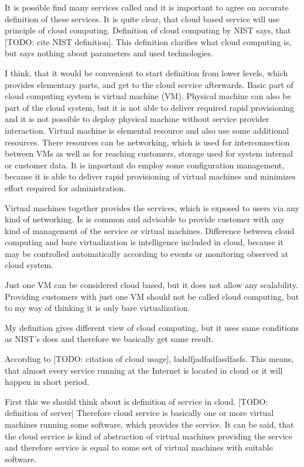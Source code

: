 
It is possible find many services called  and it is important to agree on accurate definition of these services. It is quite clear, that cloud based service will use principle of cloud computing. Definition of cloud computing by \Ac{NIST} says, that  [TODO: cite NIST definition]. This definition clarifies what cloud computing is, but says nothing about parameters and used technologies.

I think, that it would be convenient to start definition from lower levels, which provides elementary parts, and get to the cloud service afterwards. Basic part of cloud computing system is virtual machine (\Ac{VM}). Physical machine can also be part of the cloud system, but it is not able to deliver required rapid provisioning and it is not possible to deploy physical machine without service provider interaction. Virtual machine is elemental resource and also use some additional resources. There resources can be networking, which is used for interconnection between \Ac{VM}s as well as for reaching customers, storage used for system internal or customer data. It is important do employ some configuration management, because it is able to deliver rapid provisioning of virtual machines and minimizes effort required for administration.

Virtual machines together provides the services, which is exposed to users via any kind of networking. Is is common and advisable to provide customer with any kind of management of the service or virtual machines. Difference between cloud computing and bare virtualization is intelligence included in cloud, because it may be controlled automatically according to events or monitoring observed at cloud system. 

Just one \Ac{VM} can be considered cloud based, but it does not allow any scalability. Providing customers with just one \Ac{VM} should not be called cloud computing, but to my way of thinking it is only bare virtualization.

My definition gives different view of cloud computing, but it uses same conditions as \Ac{NIST}'s does and therefore we basically get same result.


According to [TODO: citation of cloud usage], ladslfjadfadfasdfasfs. This means, that almost every service running at the Internet is located in cloud or it will happen in short period. 

First this we should think about is definition of service in cloud. [TODO: definition of server] Therefore cloud service is basically one or more virtual machines running some software, which provides the service. It can be said, that the cloud service is kind of abstraction of virtual machines providing the service and therefore service is equal to some set of virtual machines with suitable software.


